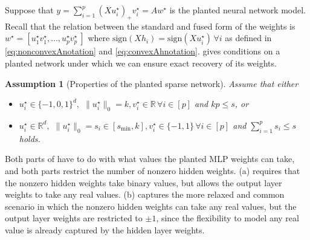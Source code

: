 \documentclass{article} %
\newcommand{\p}{\ensuremath{p}}
\newcommand{\datadim}{\ensuremath{d}}
\newcommand{\w}{\ensuremath{w}}
\newtheorem{assumption}{Assumption}
\newcommand{\1}{\ensuremath{{\sf (i)}}}
\newcommand{\2}{\ensuremath{{\sf (ii)}}}
\newcommand{\3}{\ensuremath{{\sf (iii)}}}
\newcommand{\4}{\ensuremath{{\sf (iv)}}}
\newcommand{\5}{\ensuremath{{\sf (v)}}}
\newcommand{\6}{\ensuremath{{\sf (vi)}}}
\newcommand{\R}{\mathbb{R}}
\begin{document}
Suppose that $y=\sum_{i=1}^\p (Xu_i^\star)_+ v_i^\star = A\w^\star$ is the planted neural network model. Recall that the relation between the standard and fused form of the weights is $\w^\star=[u_1^\star v_1^\star,...,u_\p^\star v_\p^\star\ ]$ where $\mathrm{sign}(Xh_i)=\mathrm{sign}(Xu^\star_i)\,\forall i$ as defined in \eqref{eq:nonconvexAnotation} and \eqref{eq:convexAhnotation}.  gives conditions on a planted network under which we can ensure exact recovery of its weights.
\begin{assumption}[Properties of the planted sparse network]
\label{assumption 1}
Assume that either
\begin{itemize}
    \item[(a)] $u_i^\star\in \{-1,0,1\}^\datadim,$ $\|u_i^\star\|_0= k, v_i^\star\in \R\,\forall i\in[\p]$ and $k\p \le s$, or
    \item[(b)] $u_i^\star\in \R^\datadim,$ $\|u^\star_i\|_0  =s_i \in [s_\text{min}, k], v_i^\star\in \{-1,1\}\,\forall i\in[\p]$ and $\sum_{i=1}^\p s_i \le s$ holds.
\end{itemize}
\end{assumption}

    Both parts of  have to do with what values the planted MLP weights can take, and both parts restrict the number of nonzero hidden weights. (a) requires that the nonzero hidden weights take binary values, but allows the output layer weights to take any real values. (b) captures the more relaxed and common scenario in which the nonzero hidden weights can take any real values, but the output layer weights are restricted to $\pm 1$, since the flexibility to model any real value is already captured by the hidden layer weights.
\end{document}
